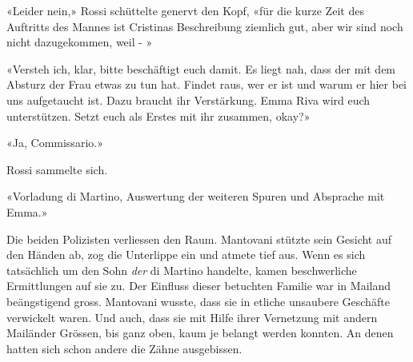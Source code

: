 «Leider nein,» Rossi schüttelte genervt den Kopf, «für die kurze Zeit
des Auftritts des Mannes ist Cristinas Beschreibung ziemlich gut, aber
wir sind noch nicht dazugekommen, weil - »

«Versteh ich, klar, bitte beschäftigt euch damit. Es liegt nah, dass der
mit dem Absturz der Frau etwas zu tun hat. Findet raus, wer er ist und
warum er hier bei uns aufgetaucht ist. Dazu braucht ihr Verstärkung.
Emma Riva wird euch unterstützen. Setzt euch als Erstes mit ihr
zusammen, okay?»

«Ja, Commissario.»

Rossi sammelte sich.

«Vorladung di Martino, Auswertung der weiteren Spuren und Absprache mit
Emma.»

Die beiden Polizisten verliessen den Raum.
Mantovani stützte sein Gesicht auf den Händen ab, zog die Unterlippe ein
und atmete tief aus. Wenn es sich tatsächlich um den Sohn \emph{der} di
Martino handelte, kamen beschwerliche Ermittlungen auf sie zu. Der
Einfluss dieser betuchten Familie war in Mailand beängstigend gross.
Mantovani wusste, dass sie in etliche unsaubere Geschäfte verwickelt
waren. Und auch, dass sie mit Hilfe ihrer Vernetzung mit andern
Mailänder Grössen, bis ganz oben, kaum je belangt werden konnten. An
denen hatten sich schon andere die Zähne ausgebissen.
